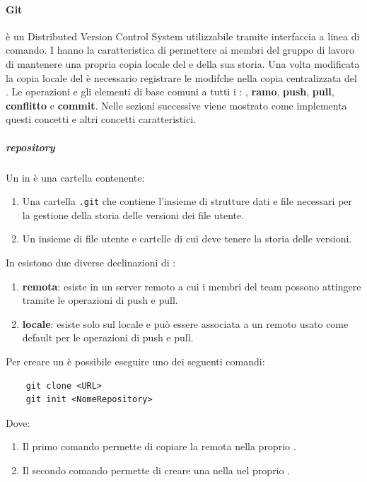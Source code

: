 \paragraph{Git}
 è un Distributed Version Control System   utilizzabile tramite interfaccia a linea di comando.
I  hanno la caratteristica di permettere ai membri del gruppo di lavoro di mantenere una propria copia locale del  e della sua storia.
Una volta modificata la copia locale del  è necessario registrare le modifche nella copia centralizzata del .
Le operazioni e gli elementi di base comuni a tutti i : \textbf{}, \textbf{ramo}, \textbf{push}, \textbf{pull}, \textbf{conflitto} e \textbf{commit}.
Nelle sezioni successive viene mostrato come  implementa questi concetti e altri concetti caratteristici.

\subparagraph{repository}
Un  in  è una cartella contenente:
\begin{enumerate}
    \item Una cartella \texttt{.git} che contiene l'insieme di strutture dati e file necessari per la gestione della storia delle versioni dei file utente.
    \item Un insieme di file utente e cartelle di cui  deve tenere la storia delle versioni.
\end{enumerate}
In  esistono due diverse declinazioni di :
\begin{enumerate}
    \item \textbf{remota}: esiste in un server remoto a cui i membri del team possono attingere tramite le operazioni di push e pull.
    
    \item \textbf{locale}: esiste solo sul  locale e può essere associata a un  remoto usato come default per le operazioni di push e pull. 
\end{enumerate} 
Per creare un  è possibile eseguire uno dei seguenti comandi:
\begin{lstlisting}
    git clone <URL>
    git init <NomeRepository>
\end{lstlisting}
Dove:
\begin{enumerate}
    \item Il primo comando permette di copiare la  remota nella  proprio .
    \item Il secondo comando permette di creare una  nella  nel proprio .
\end{enumerate}

